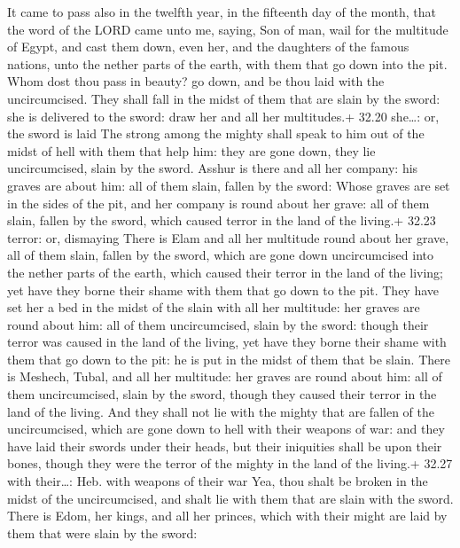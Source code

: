  It came to pass also in the twelfth year, in the
fifteenth day of the month, that the word of the LORD came unto me,
saying,  Son of man, wail for the multitude of Egypt, and
cast them down, even her, and the daughters of the famous nations, unto
the nether parts of the earth, with them that go down into the pit.
 Whom dost thou pass in beauty? go down, and be thou laid
with the uncircumcised.  They shall fall in the midst of
them that are slain by the sword: she is delivered to the sword: draw
her and all her multitudes.+ 32.20 she\ldots: or, the sword is laid
 The strong among the mighty shall speak to him out of the
midst of hell with them that help him: they are gone down, they lie
uncircumcised, slain by the sword.  Asshur is there and all
her company: his graves are about him: all of them slain, fallen by the
sword:  Whose graves are set in the sides of the pit, and
her company is round about her grave: all of them slain, fallen by the
sword, which caused terror in the land of the living.+ 32.23 terror: or,
dismaying  There is Elam and all her multitude round about
her grave, all of them slain, fallen by the sword, which are gone down
uncircumcised into the nether parts of the earth, which caused their
terror in the land of the living; yet have they borne their shame with
them that go down to the pit.  They have set her a bed in
the midst of the slain with all her multitude: her graves are round
about him: all of them uncircumcised, slain by the sword: though their
terror was caused in the land of the living, yet have they borne their
shame with them that go down to the pit: he is put in the midst of them
that be slain.  There is Meshech, Tubal, and all her
multitude: her graves are round about him: all of them uncircumcised,
slain by the sword, though they caused their terror in the land of the
living.  And they shall not lie with the mighty that are
fallen of the uncircumcised, which are gone down to hell with their
weapons of war: and they have laid their swords under their heads, but
their iniquities shall be upon their bones, though they were the terror
of the mighty in the land of the living.+ 32.27 with their\ldots: Heb.
with weapons of their war  Yea, thou shalt be broken in the
midst of the uncircumcised, and shalt lie with them that are slain with
the sword.  There is Edom, her kings, and all her princes,
which with their might are laid by them that were slain by the sword:

